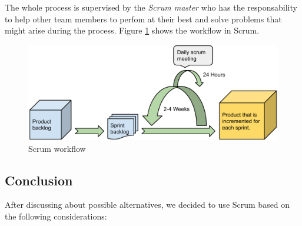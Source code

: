 The whole process is supervised by the \textit{Scrum master} who has the responsability to help other team members to perfom at their best and solve problems that might arise during the process.
Figure \ref{figure:scrum-workflow} shows the workflow in Scrum. \cite{Compendium}

\begin{figure}[h]
\begin{center}
\includegraphics[scale=0.5]{../Figures/Scrum-workflow.pdf}
\end{center}
\caption{Scrum workflow}
\label{figure:scrum-workflow}
\end{figure}

\subsection{Conclusion}
\label{subsec:devprocess}

After discussing about possible alternatives, we decided to use Scrum based on the following considerations:

